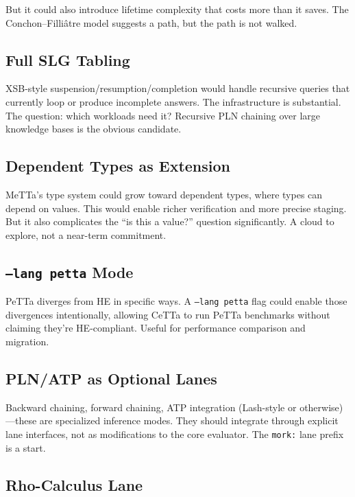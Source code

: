 \documentclass[11pt]{article}
\newcommand{\code}[1]{\texttt{#1}}
\newcommand{\PeTTa}{\textup{PeTTa}}
\newcommand{\HE}{\textup{HE}}
\newcommand{\CeTTa}{\textup{CeTTa}}
\newcommand{\XSB}{\textup{XSB}}
\begin{document}
But it could also introduce lifetime complexity that costs more than
it saves.  The Conchon--Filliâtre model suggests a path, but the path
is not walked.

\subsection{Full SLG Tabling}

\XSB{}-style suspension/resumption/completion would handle recursive
queries that currently loop or produce incomplete answers.  The
infrastructure is substantial.  The question: which workloads need it?
Recursive PLN chaining over large knowledge bases is the obvious
candidate.

\subsection{Dependent Types as Extension}

MeTTa's type system could grow toward dependent types, where types
can depend on values.  This would enable richer verification and
more precise staging.  But it also complicates the ``is this a value?''
question significantly.  A cloud to explore, not a near-term commitment.

\subsection{\code{--lang petta} Mode}

\PeTTa{} diverges from \HE{} in specific ways.  A \code{--lang petta}
flag could enable those divergences intentionally, allowing \CeTTa{}
to run \PeTTa{} benchmarks without claiming they're \HE{}-compliant.
Useful for performance comparison and migration.

\subsection{PLN/ATP as Optional Lanes}

Backward chaining, forward chaining, ATP integration (Lash-style or
otherwise)---these are specialized inference modes.  They should
integrate through explicit lane interfaces, not as modifications to
the core evaluator.  The \code{mork:} lane prefix is a start.

\subsection{Rho-Calculus Lane}
\end{document}
